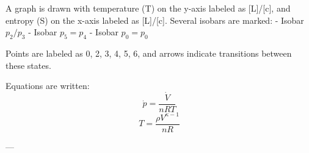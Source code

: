 A graph is drawn with temperature (T) on the y-axis labeled as [L]/[c], and entropy (S) on the x-axis labeled as [L]/[c]. Several isobars are marked:  
- Isobar \( p_2/p_3 \)  
- Isobar \( p_5 = p_4 \)  
- Isobar \( p_0 = p_0 \)  

Points are labeled as 0, 2, 3, 4, 5, 6, and arrows indicate transitions between these states.  

Equations are written:  
\[
\dot{p} = \frac{\dot{V}}{nRT}
\]  
\[
T = \frac{\rho V^{\kappa - 1}}{nR}
\]  

---